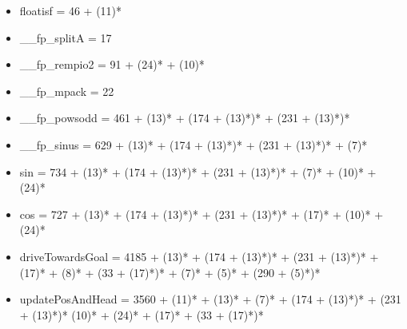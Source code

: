 \begin{itemize}
	\item floatisf = 46 + (11)*
	\item \_\_fp\_splitA = 17
	\item \_\_fp\_rempio2 = 91 + (24)* + (10)*
	\item \_\_fp\_mpack = 22
	\item \_\_fp\_powsodd = 461 + (13)* + (174 + (13)*)* + (231 + (13)*)*
	\item \_\_fp\_sinus = 629 + (13)* + (174 + (13)*)* + (231 + (13)*)* + (7)*
	\item sin = 734 + (13)* + (174 + (13)*)* + (231 + (13)*)* + (7)* + (10)* + (24)*
	\item cos = 727 + (13)* + (174 + (13)*)* + (231 + (13)*)* + (17)* + (10)* + (24)*
	\item driveTowardsGoal = 4185 + (13)* + (174 + (13)*)* + (231 + (13)*)* + (17)* + (8)* + (33 + (17)*)* + (7)* + (5)* + (290 + (5)*)*
	\item updatePosAndHead = 3560 + (11)* + (13)* + (7)* + (174 + (13)*)* + (231 + (13)*)* (10)* + (24)* + (17)* + (33 + (17)*)*
\end{itemize}